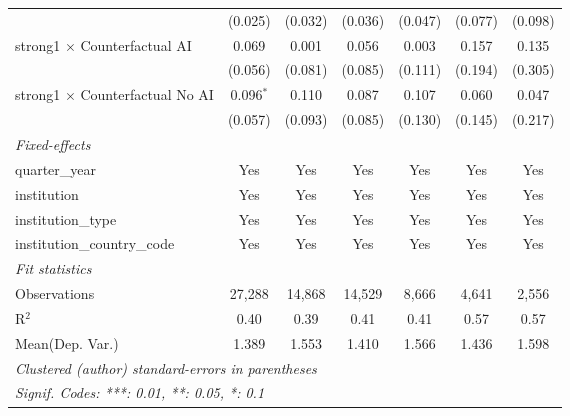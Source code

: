 \begin{tabular}{lcccccc}
                                          & (0.025)        & (0.032)       & (0.036)       & (0.047)       & (0.077)       & (0.098)\\   
   strong1 $\times$ Counterfactual AI     & 0.069          & 0.001         & 0.056         & 0.003         & 0.157         & 0.135\\   
                                          & (0.056)        & (0.081)       & (0.085)       & (0.111)       & (0.194)       & (0.305)\\   
   strong1 $\times$ Counterfactual No AI  & 0.096$^{*}$    & 0.110         & 0.087         & 0.107         & 0.060         & 0.047\\   
                                          & (0.057)        & (0.093)       & (0.085)       & (0.130)       & (0.145)       & (0.217)\\   
   \midrule
   \emph{Fixed-effects}\\
   quarter\_year                          & Yes            & Yes           & Yes           & Yes           & Yes           & Yes\\  
   institution                            & Yes            & Yes           & Yes           & Yes           & Yes           & Yes\\  
   institution\_type                      & Yes            & Yes           & Yes           & Yes           & Yes           & Yes\\  
   institution\_country\_code             & Yes            & Yes           & Yes           & Yes           & Yes           & Yes\\  
   \midrule
   \emph{Fit statistics}\\
   Observations                           & 27,288         & 14,868        & 14,529        & 8,666         & 4,641         & 2,556\\  
   R$^2$                                  & 0.40           & 0.39          & 0.41          & 0.41          & 0.57          & 0.57\\  
Mean(Dep. Var.) & 1.389 & 1.553 & 1.410 & 1.566 & 1.436 & 1.598 \\
   \midrule \midrule
   \multicolumn{7}{l}{\emph{Clustered (author) standard-errors in parentheses}}\\
   \multicolumn{7}{l}{\emph{Signif. Codes: ***: 0.01, **: 0.05, *: 0.1}}\\
\end{tabular}
\par\endgroup
